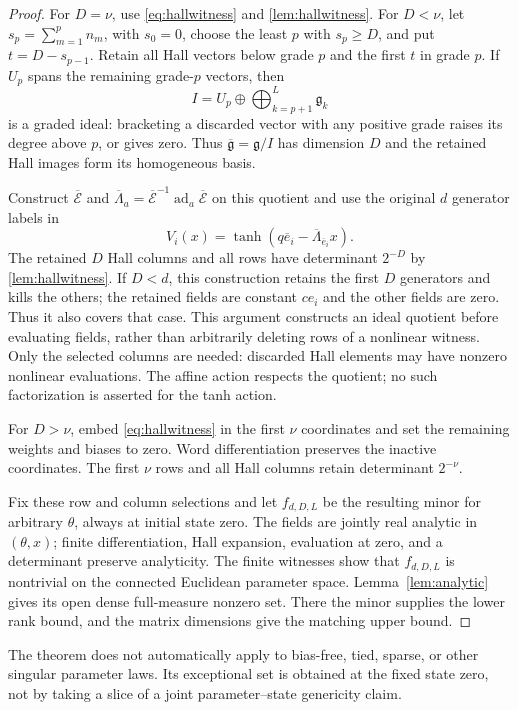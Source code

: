 \documentclass[11pt,a4paper]{article}
\numberwithin{equation}{section}
\theoremstyle{definition}
\theoremstyle{remark}
\begin{document}
\begin{proof}
For $D=\nu$, use \eqref{eq:hallwitness} and \cref{lem:hallwitness}.
For $D<\nu$, let $s_p=\sum_{m=1}^p n_m$, with $s_0=0$, choose the
least $p$ with $s_p\geq D$, and put $t=D-s_{p-1}$. Retain all Hall
vectors below grade $p$ and the first $t$ in grade $p$. If $U_p$ spans
the remaining grade-$p$ vectors, then
\[
 I=U_p\oplus\bigoplus_{k=p+1}^L\mathfrak g_k
\]
is a graded ideal: bracketing a discarded vector with any positive
grade raises its degree above $p$, or gives zero. Thus
$\overline{\mathfrak g}=\mathfrak g/I$ has dimension $D$ and the
retained Hall images form its homogeneous basis.

Construct $\overline{\mathcal E}$ and
$\overline\Lambda_a=\overline{\mathcal E}^{-1}
\operatorname{ad}_a\overline{\mathcal E}$ on this quotient and use the
original $d$ generator labels in
\[
 V_i(x)=\tanh(q\overline e_i-
                    \overline\Lambda_{\overline e_i}x).
\]
The retained $D$ Hall columns and all rows have determinant $2^{-D}$
by \cref{lem:hallwitness}. If $D<d$, this construction retains the
first $D$ generators and kills the others; the retained fields are
constant $ce_i$ and the other fields are zero. Thus it also covers
that case. This argument constructs an ideal quotient before evaluating
fields, rather than arbitrarily deleting rows of a nonlinear witness.
Only the selected columns are needed: discarded Hall elements may have
nonzero nonlinear evaluations. The affine action respects the quotient;
no such factorization is asserted for the tanh action.

For $D>\nu$, embed \eqref{eq:hallwitness} in the first $\nu$ coordinates
and set the remaining weights and biases to zero. Word differentiation
preserves the inactive coordinates. The first $\nu$ rows and all Hall
columns retain determinant $2^{-\nu}$.

Fix these row and column selections and let $f_{d,D,L}$ be the resulting
minor for arbitrary $\theta$, always at initial state zero. The fields
are jointly real analytic in $(\theta,x)$; finite differentiation,
Hall expansion, evaluation at zero, and a determinant preserve
analyticity. The finite witnesses show that $f_{d,D,L}$ is nontrivial
on the connected Euclidean parameter space.
Lemma~\ref{lem:analytic} gives its open dense full-measure nonzero set.
There the minor supplies the lower rank bound, and the matrix dimensions
give the matching upper bound.
\end{proof}
The theorem does not automatically apply to bias-free, tied, sparse, or
other singular parameter laws. Its exceptional set is obtained at the fixed state
zero, not by taking a slice of a joint parameter--state genericity claim.
\end{document}
